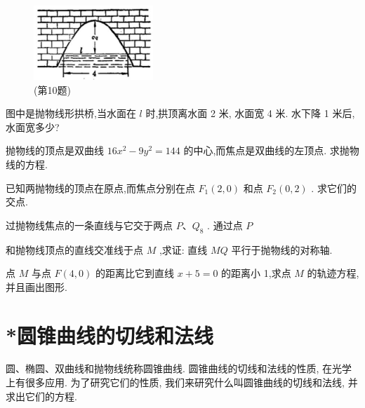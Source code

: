 \documentclass[lang=cn,newtx,10.5pt,scheme=chinese]{elegantbook}
\begin{document}
\begin{problemset}[习 题 八]
\begin{figure}[h]
  \centering
  \includegraphics[max width=0.4\textwidth]{images/01912cc2-ffb6-728e-9ae7-b113ff05c64b_116_944899.jpg}
  \caption{(第10题)}
\end{figure}



\item 图中是抛物线形拱桥,当水面在 \(l\) 时,拱顶离水面 2 米, 水面宽 4 米. 水下降 1 米后, 水面宽多少?

\item 抛物线的顶点是双曲线 \({16}{x}^{2} - 9{y}^{2} = {144}\) 的中心,而焦点是双曲线的左顶点. 求抛物线的方程.

\item 已知两抛物线的顶点在原点,而焦点分别在点 \({F}_{1}\left( {2,0}\right)\) 和点 \({F}_{2}\left( {0,2}\right)\) . 求它们的交点.

\item 过抛物线焦点的一条直线与它交于两点 \(P\text{、}{Q}_{8}\) . 通过点 \(P\)

和抛物线顶点的直线交准线于点 \(M\) ,求证: 直线 \({MQ}\) 平行于抛物线的对称轴.

\item 点 \(M\) 与点 \(F\left( {4,0}\right)\) 的距离比它到直线 \(x + 5 = 0\) 的距离小 1,求点 \(M\) 的轨迹方程,并且画出图形.

\end{problemset}

\section{*圆锥曲线的切线和法线}

圆、椭圆、双曲线和抛物线统称圆锥曲线. 圆锥曲线的切线和法线的性质, 在光学上有很多应用. 为了研究它们的性质, 我们来研究什么叫圆锥曲线的切线和法线, 并求出它们的方程.
\end{document}
